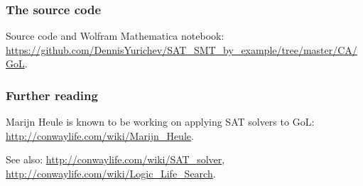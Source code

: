 \subsubsection{The source code}

Source code and Wolfram Mathematica notebook: \url{https://github.com/DennisYurichev/SAT_SMT_by_example/tree/master/CA/GoL}.

\subsubsection{Further reading}

Marijn Heule is known to be working on applying SAT solvers to GoL:
\url{http://conwaylife.com/wiki/Marijn_Heule}.

See also:
\url{http://conwaylife.com/wiki/SAT_solver},
\url{http://conwaylife.com/wiki/Logic_Life_Search}.

